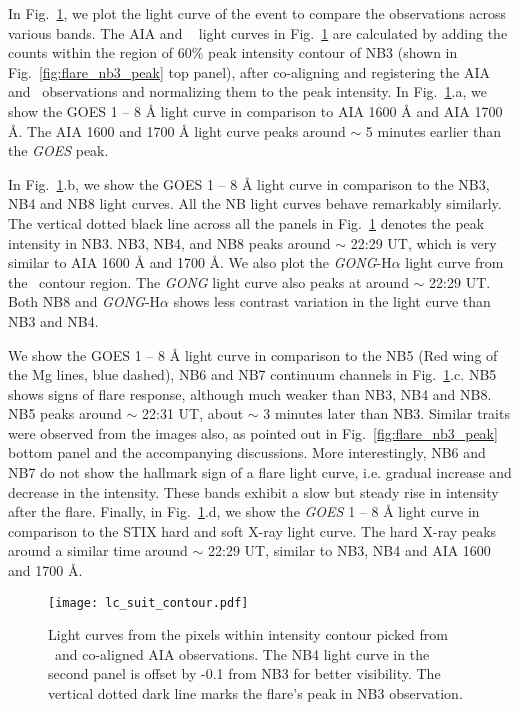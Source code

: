 In Fig.~\ref{fig:flare_lc_suit}, we plot the light curve of the event to compare the observations across various bands. The AIA and \suit~ light curves in Fig.~\ref{fig:flare_lc_suit} are calculated by adding the counts within the region of 60\% peak intensity contour of NB3 (shown in Fig.~\ref{fig:flare_nb3_peak} top panel), after co-aligning and registering the AIA and \suit~observations and normalizing them to the peak intensity. In Fig.~\ref{fig:flare_lc_suit}.a, we show the GOES 1 {--} 8 {\AA} light curve in comparison to AIA 1600 {\AA} and AIA 1700 {\AA}. The AIA 1600 and 1700 {\AA} light curve peaks around $\sim$ 5 minutes earlier than the {\it GOES} peak. 

In Fig.~\ref{fig:flare_lc_suit}.b, we show the GOES 1 {--} 8 {\AA} light curve in comparison to the NB3, NB4 and NB8 light curves. All the NB light curves behave remarkably similarly. The vertical dotted black line across all the panels in Fig.~\ref{fig:flare_lc_suit} denotes the peak intensity in NB3. NB3, NB4, and NB8 peaks around $\sim$ 22:29 UT, which is very similar to AIA 1600 {\AA} and 1700 {\AA}. We also plot the {\it GONG}-H$\alpha$ light curve from the \suit~contour region. The {\it GONG} light curve also peaks at around $\sim$ 22:29 UT. Both NB8 and {\it GONG}-H$\alpha$ shows less contrast variation in the light curve than NB3 and NB4.

We show the GOES 1 {--} 8 {\AA} light curve in comparison to the NB5 (Red wing of the Mg lines, blue dashed), NB6 and NB7 continuum channels in Fig.~\ref{fig:flare_lc_suit}.c. NB5 shows signs of flare response, although much weaker than NB3, NB4 and NB8. NB5 peaks around $\sim$ 22:31 UT, about $\sim$ 3 minutes later than NB3. Similar traits were observed from the images also, as pointed out in Fig.~\ref{fig:flare_nb3_peak} bottom panel and the accompanying discussions. More interestingly, NB6 and NB7 do not show the hallmark sign of a flare light curve, i.e. gradual increase and decrease in the intensity. These bands exhibit a slow but steady rise in intensity after the flare. Finally, in Fig.~\ref{fig:flare_lc_suit}.d, we show the {\it GOES} 1 {--} 8 {\AA} light curve in comparison to the STIX hard and soft X-ray light curve. The hard X-ray peaks around a similar time around $\sim$ 22:29 UT, similar to NB3, NB4 and AIA 1600 and 1700 {\AA}.

\begin{figure}[ht!]
    \centering
    \texttt{[image: lc\_suit\_contour.pdf]}
    \caption[Light curves of the {\suit} observations from NB3 contours.]{Light curves from the pixels within intensity contour picked from \suit~and co-aligned AIA observations. The NB4 light curve in the second panel is offset by -0.1 from NB3 for better visibility. The vertical dotted dark line marks the flare's peak in NB3 observation.}
    \label{fig:flare_lc_suit}
\end{figure}

